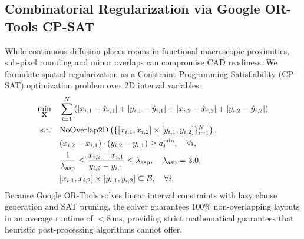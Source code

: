 \documentclass[journal]{IEEEtran}
\begin{document}
\subsection{Combinatorial Regularization via Google OR-Tools CP-SAT}
While continuous diffusion places rooms in functional macroscopic proximities, sub-pixel rounding and minor overlaps can compromise CAD readiness. We formulate spatial regularization as a Constraint Programming Satisfiability (CP-SAT) optimization problem over 2D interval variables:
\begin{align}
\min_{\mathbf{X}} \quad & \sum_{i=1}^N \left( |x_{i,1} - \hat{x}_{i,1}| + |y_{i,1} - \hat{y}_{i,1}| + |x_{i,2} - \hat{x}_{i,2}| + |y_{i,2} - \hat{y}_{i,2}| \right) \notag \\
\text{s.t.} \quad & \mathrm{NoOverlap2D}\left( \{[x_{i,1}, x_{i,2}] \times [y_{i,1}, y_{i,2}]\}_{i=1}^N \right), \label{eq:cpsat_nooverlap} \\
& (x_{i,2} - x_{i,1}) \cdot (y_{i,2} - y_{i,1}) \ge a_i^{\min}, \quad \forall i, \label{eq:cpsat_area} \\
& \frac{1}{\lambda_{\mathrm{asp}}} \le \frac{x_{i,2} - x_{i,1}}{y_{i,2} - y_{i,1}} \le \lambda_{\mathrm{asp}}, \quad \lambda_{\mathrm{asp}} = 3.0, \label{eq:cpsat_aspect} \\
& [x_{i,1}, x_{i,2}] \times [y_{i,1}, y_{i,2}] \subseteq \mathcal{B}, \quad \forall i. \label{eq:cpsat_bound}
\end{align}
Because Google OR-Tools solves linear interval constraints with lazy clause generation and SAT pruning, the solver guarantees 100\% non-overlapping layouts in an average runtime of $< 8\,\mathrm{ms}$, providing strict mathematical guarantees that heuristic post-processing algorithms cannot offer.
\end{document}
